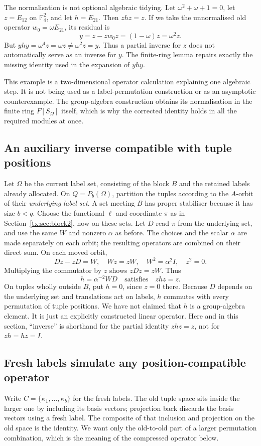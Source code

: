 \documentclass[11pt,a4paper,oneside,openany]{book}
\theoremstyle{definition}\newtheorem{definition}[theorem]{Definition}
\theoremstyle{remark}\newtheorem{remark}[theorem]{Remark}
\numberwithin{equation}{chapter}
\begin{document}
The normalisation is not optional algebraic tidying. Let
$\omega^2+\omega+1=0$, let $z=E_{12}$ on $\mathbb F_4^2$, and
let $h=E_{21}$. Then $zhz=z$. If we take the unnormalised old
operator $w_0=\omega E_{21}$, its residual is
\[
                   y=z-zw_0z=(1-\omega)z=\omega^2z.
\]
But $yhy=\omega^4z=\omega z\ne\omega^2z=y$. Thus a partial inverse
for $z$ does not automatically serve as an inverse for $y$. The
finite-ring lemma repairs exactly the missing identity used in the
expansion of $yhy$.

This example is a two-dimensional operator calculation explaining
one algebraic step. It is not being used as a label-permutation
construction or as an asymptotic counterexample. The group-algebra
construction obtains its normalisation in the finite ring
$F[S_\Omega]$ itself, which is why the corrected identity holds in
all the required modules at once.

\subsection{An auxiliary inverse compatible with tuple positions}
Let $\Omega$ be the current label set, consisting of the block $B$ and the retained labels already allocated. On $Q=P_b(\Omega)$, partition the tuples according to the $A$-orbit of their \emph{underlying label set}. A set meeting $B$ has proper stabiliser because it has size $b<q$. Choose the functional $\ell$ and coordinate $\pi$ as in Section~\ref{tx:sec:block2}, now on these sets. Let $D$ read $\pi$ from the underlying set, and use the same $W$ and nonzero $\alpha$ as before. The choices and the scalar $\alpha$ are made separately on each orbit; the resulting operators are combined on their direct sum. On each moved orbit,
\[Dz-zD=W,\quad Wz=zW,\quad W^2=\alpha^2I,\quad z^2=0.\]
Multiplying the commutator by $z$ shows $zDz=zW$. Thus
\[h=\alpha^{-2}WD\quad\text{satisfies}\quad zhz=z.\]
On tuples wholly outside $B$, put $h=0$, since $z=0$ there. Because $D$ depends on the underlying set and translations act on labels, $h$ commutes with every permutation of tuple positions. We have not claimed that $h$ is a group-algebra element. It is just an explicitly constructed linear operator.
Here and in this section, ``inverse'' is shorthand for the partial
identity $zhz=z$, not for $zh=hz=I$.

\subsection{Fresh labels simulate any position-compatible operator}
Write $C=\{\kappa_1,\ldots,\kappa_b\}$ for the fresh labels.
The old tuple space sits inside the larger one by including its basis
vectors; projection back discards the basis vectors using a fresh label.
The composite of that inclusion and projection on the old space is
the identity. We want only the old-to-old part of a larger permutation
combination, which is the meaning of the compressed operator below.
\end{document}
